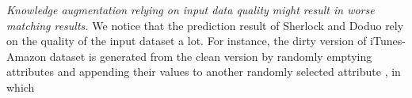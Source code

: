 \textit{Knowledge augmentation relying on input data quality might result in worse matching results.}
We notice that the prediction result of Sherlock and Doduo rely on the quality of the input dataset a lot. For instance, the dirty version of iTunes-Amazon dataset is generated from the clean version by randomly emptying attributes and appending their values to another randomly selected
attribute \cite{li_deep_2020}, in which 
